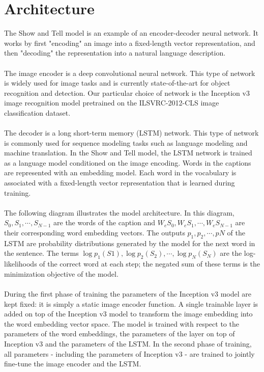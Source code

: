 \documentclass[english]{article}
\begin{document}
\section{Architecture}
The Show and Tell model is an example of an encoder-decoder neural network. It works by first "encoding" an image into a fixed-length vector representation, and then "decoding" the representation into a natural language description.\\\\
The image encoder is a deep convolutional neural network. This type of network is widely used for image tasks and is currently
state-of-the-art for object recognition and detection. Our particular choice of network is the Inception v3 image recognition model
pretrained on the ILSVRC-2012-CLS image classification dataset.\\\\
The decoder is a long short-term memory (LSTM) network. This type of network is commonly used for sequence modeling tasks such as
language modeling and machine translation. In the Show and Tell model, the LSTM network is trained as a language model conditioned on
the image encoding. Words in the captions are represented with an embedding model. Each word in the vocabulary is associated with a fixed-length vector representation that is learned during training.\\\\
The following diagram illustrates the model architecture. In this diagram, $S_0, S_1, \cdots, S_{N-1}$ are the words of the caption and $W_eS_0, W_eS_1, \cdots, W_eS_{N-1}$ are their corresponding word embedding vectors. The outputs $p_1, p_2, \cdots, pN$ of the LSTM are probability distributions generated by the model for the next word in the sentence. The terms $\log p_1(S1), \log p_2(S_2), \cdots, \log p_N(S_N)$ are the log-likelihoods of the correct word at each step; the negated sum of these terms is the minimization objective of the model.\\\\
During the first phase of training the parameters of the Inception v3 model are kept fixed: it is simply a static image encoder function. A single trainable layer is added on top of the Inception v3 model to transform the image embedding into the word embedding vector space. The model is trained with respect to the parameters of the word embeddings, the parameters of the layer on top of Inception v3 and the parameters of the LSTM. In the second phase of training, all parameters - including the parameters of Inception v3 - are trained to jointly fine-tune the image encoder and the LSTM.\\\\
\end{document}
